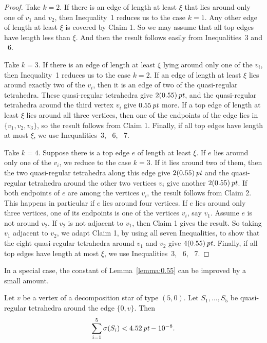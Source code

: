 \begin{proof}
Take $k=2$. If there is an edge of length at least $\xi$ that lies
around only one of $v_1$ and $v_2$, then Inequality~1 reduces us
to the case $k=1$.  Any other edge of length at least $\xi$ is
covered by Claim 1.  So we may assume that all top edges have
length less than $\xi$.  And then the result follows easily from
Inequalities~3 and ~6.

Take $k=3$. If there is an edge of length at least $\xi$ lying
around only one of the $v_i$, then Inequality~1 reduces us to the
case $k=2$. If an edge of length at least $\xi$ lies around
exactly two of the $v_i$, then it is an edge of two of the
quasi-regular tetrahedra. These quasi-regular tetrahedra give
$2(0.55)\,\hbox{\it pt}$, and the quasi-regular tetrahedra around the third
vertex $v_i$ give $0.55\,\hbox{\it pt}$ more. If a top edge of length at
least $\xi$ lies around all three vertices, then one of the
endpoints of the edge lies in $\{v_1,v_2,v_3\}$, so the result
follows from Claim 1. Finally, if all top edges have length at
most $\xi$, we use Inequalities~3, ~6, ~7.

Take $k=4$.  Suppose there is a top edge $e$ of length at least
$\xi$. If $e$ lies around only one of the $v_i$, we reduce to the
case $k=3$. If it lies around two of them, then the two
quasi-regular tetrahedra along this edge give $2(0.55)\,\hbox{\it pt}$ and
the quasi-regular tetrahedra around the other two vertices $v_i$
give another $2(0.55)\,\hbox{\it pt}$.  If both endpoints of $e$ are among
the vertices $v_i$, the result follows from Claim 2.  This happens
in particular if $e$ lies around four vertices.  If $e$ lies
around only three vertices, one of its endpoints is one of the
vertices $v_i$, say $v_1$.  Assume $e$ is not around $v_2$. If
$v_2$ is not adjacent to $v_1$, then Claim 1 gives the result. So
taking $v_1$ adjacent to $v_2$, we adapt Claim 1, by using all
seven Inequalities, to show that the eight quasi-regular
tetrahedra around $v_1$ and $v_2$ give $4(0.55)\,\hbox{\it pt}$. Finally, if
all top edges have length at most $\xi$, we use Inequalities~3,
~6, ~7.
\end{proof}

In a special case, the constant of Lemma~\ref{lemma:0.55} can be
improved by a small amount.  

\begin{lemma}
    \label{lemma:0.55A}
Let $v$ be a vertex of a decomposition star of type $(5,0)$.  Let
$S_1,\ldots, S_5$ be quasi-regular tetrahedra around the edge
$\{0,v\}$. Then
    $$\sum_{i=1}^5 \sigma(S_i) < 4.52\,\hbox{\it pt} - 10^{-8}.$$
\end{lemma}

